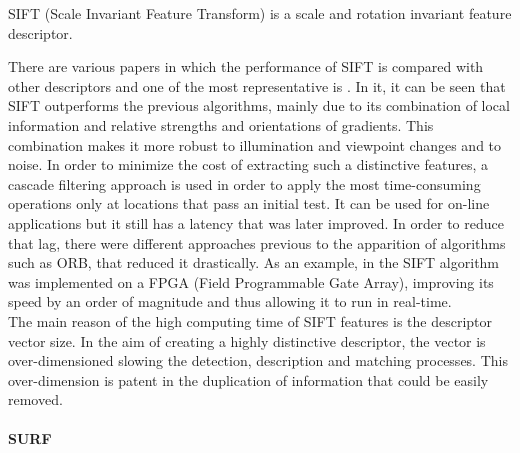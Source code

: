 SIFT (Scale Invariant Feature Transform) is a scale and rotation invariant feature descriptor\cite{sift}. 

There are various papers in which the performance of SIFT is compared with other descriptors and one of the most representative is \cite{Mikolajczyk2005}. In it, it can be seen that SIFT 
outperforms the previous algorithms, mainly due to its combination of local information and relative strengths and orientations of gradients. This combination makes it more robust to illumination and viewpoint changes and to noise. 
In order to minimize the cost of extracting such a distinctive features, a cascade filtering approach is used in order to apply the most time-consuming operations only at locations that pass an initial test. 
It can be used for on-line applications but it still has a latency that was later improved. 
In order to reduce that lag, there were different approaches previous to the apparition of algorithms such as ORB, that reduced it drastically\cite{orb}. 
As an example, in \cite{sift_fpga} the SIFT algorithm was implemented on a FPGA (Field Programmable Gate Array), improving its speed by an order of magnitude and thus allowing it to run in real-time.
\\

The main reason of the high computing time of SIFT features is the descriptor vector size. 
In the aim of creating a highly distinctive descriptor, the vector is over-dimensioned slowing the detection, description and matching processes. 
This over-dimension is patent in the duplication of information that could be easily removed. 




\paragraph{SURF}\mbox{}\\

